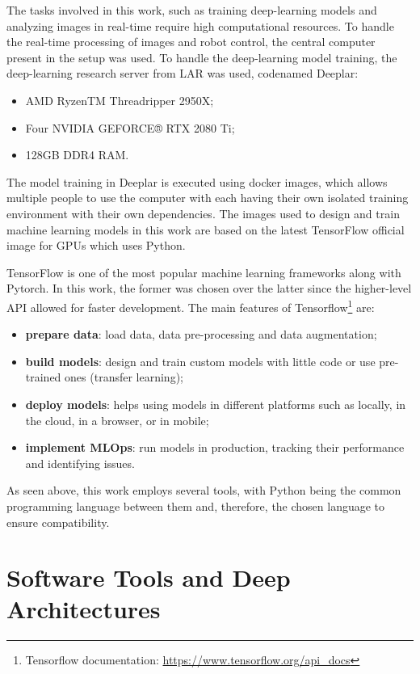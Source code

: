 The tasks involved in this work, such as training deep-learning models and analyzing images in real-time require high computational resources. To handle the real-time processing of images and robot control, the central computer present in the setup was used. To handle the deep-learning model training, the deep-learning research server from LAR was used, codenamed Deeplar:
\begin{itemize}
    \item AMD RyzenTM Threadripper 2950X;
    \item Four NVIDIA GEFORCE® RTX 2080 Ti;
    \item 128GB DDR4 RAM.
\end{itemize}

The model training in Deeplar is executed using docker images, which allows multiple people to use the computer with each having their own isolated training environment with their own dependencies. The images used to design and train machine learning models in this work are based on the latest TensorFlow official image for GPUs which uses Python.

TensorFlow is one of the most popular machine learning frameworks along with Pytorch. In this work, the former was chosen over the latter since the higher-level API allowed for faster development. The main features of Tensorflow\footnote{Tensorflow documentation: \url{https://www.tensorflow.org/api_docs}} are:
\begin{itemize}
    \item \textbf{prepare data}: load data, data pre-processing and data augmentation;
    \item \textbf{build models}: design and train custom models with little code or use pre-trained ones (transfer learning);
    \item \textbf{deploy models}: helps using models in different platforms such as locally, in the cloud, in a browser, or in mobile;
    \item \textbf{implement MLOps}: run models in production, tracking their performance and identifying issues.
\end{itemize}

As seen above, this work employs several tools, with Python being the common programming language between them and, therefore, the chosen language to ensure compatibility.

\section{Software Tools and Deep Architectures}
\label{section:methodologies}


